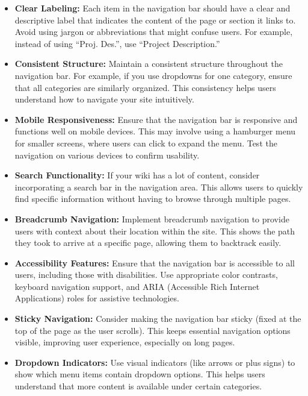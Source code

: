 \begin{itemize}
\item \textbf{Clear Labeling:}
Each item in the navigation bar should have a clear and descriptive label that indicates the content of the page or section it links to.
Avoid using jargon or abbreviations that might confuse users.
For example, instead of using ``Proj. Des.'', use ``Project Description.''

\item \textbf{Consistent Structure:}
Maintain a consistent structure throughout the navigation bar.
For example, if you use dropdowns for one category, ensure that all categories are similarly organized.
This consistency helps users understand how to navigate your site intuitively.

\item \textbf{Mobile Responsiveness:}
Ensure that the navigation bar is responsive and functions well on mobile devices.
This may involve using a hamburger menu for smaller screens, where users can click to expand the menu.
Test the navigation on various devices to confirm usability.

\item \textbf{Search Functionality:}
If your wiki has a lot of content, consider incorporating a search bar in the navigation area.
This allows users to quickly find specific information without having to browse through multiple pages.

\item \textbf{Breadcrumb Navigation:}
Implement breadcrumb navigation to provide users with context about their location within the site.
This shows the path they took to arrive at a specific page, allowing them to backtrack easily.

\item \textbf{Accessibility Features:}
Ensure that the navigation bar is accessible to all users, including those with disabilities.
Use appropriate color contrasts, keyboard navigation support, and ARIA (Accessible Rich Internet Applications) roles for assistive technologies.

\item \textbf{Sticky Navigation:}
Consider making the navigation bar sticky (fixed at the top of the page as the user scrolls).
This keeps essential navigation options visible, improving user experience, especially on long pages.

\item \textbf{Dropdown Indicators:}
Use visual indicators (like arrows or plus signs) to show which menu items contain dropdown options.
This helps users understand that more content is available under certain categories.


\end{itemize}
